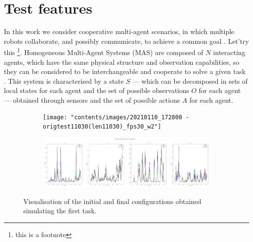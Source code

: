 

\chapter{Test features}
\label{chap:test}


In this work we consider cooperative multi-agent scenarios, in which multiple 
robots collaborate, and possibly communicate, to achieve a common goal 
\cite[][]{ismail2018survey}. Let'try this \footnote{this is a footnote}.
Homogeneous Multi-Agent Systems (MAS) are composed of $N$ interacting 
agents, which have the same physical structure and observation capabilities, so 
they can be considered to be interchangeable and cooperate to solve a given 
task \cite[][]{stone2000multiagent, vsovsic2016inverse}.
This system is characterised by a state $S$ — which can be decomposed in sets of 
local states for each agent and the set of possible observations $O$ for each agent 
— obtained through sensors and the set of possible actions  $A$ for each agent.

\begin{figure}[!htb]
	\begin{center}
		\begin{subfigure}[h]{0.49\textwidth}
			\centering
			\texttt{[image: "contents/images/20210110\_172800 - origtest11030(len11030)\_fps30\_w2"]}
		\end{subfigure}
		\hfill
		\begin{subfigure}[h]{0.49\textwidth}
			\centering
			\includegraphics[width=\textwidth]{"contents/images/20210110_172810 - origtest11030(len11030)_fps30_w5"}
		\end{subfigure}
	\end{center}
	\vspace{-0.5cm}
	\caption[Visualisation of the simulation of the first task.]{Visualisation of the 
		initial and final configurations obtained simulating the first task.}
	\label{fig:task1}
\end{figure}

